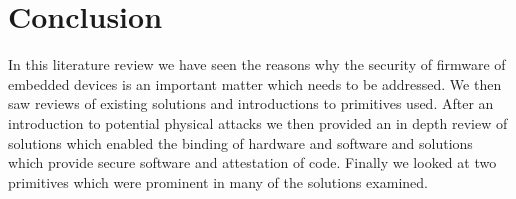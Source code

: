 \section{Conclusion}

In this literature review we have seen the reasons why the security of firmware of embedded devices is an important matter which needs to be addressed. We then saw reviews of existing solutions and introductions to primitives used. After an introduction to potential physical attacks we then provided an in depth review of solutions which enabled the binding of hardware and software and solutions which provide secure software and attestation of code. Finally we looked at two primitives which were prominent in many of the solutions examined.
